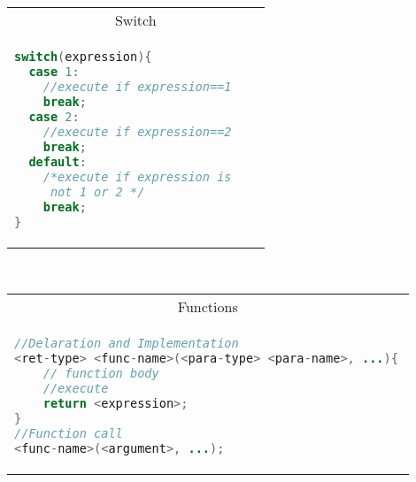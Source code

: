 \documentclass[a4paper, 8pt]{extarticle}
\begin{document}
\begin{minipage}[t]{0.25\linewidth}
\begin{tabular}[t]{|p{0.9\linewidth}|}
\multicolumn{1}{|c|}{\cellcolor{headcol}\color{white}Switch}
\\
\begin{lstlisting}[language=Java, mathescape, aboveskip=-2pt,belowskip=-7pt]
switch(expression){
  case 1:
    //execute if expression==1
    break;
  case 2:
    //execute if expression==2
    break;
  default:
    /*execute if expression is
     not 1 or 2 */
    break;
}
\end{lstlisting}
\\\hline
\end{tabular}
\\[3pt]
\begin{tabular}{|p{0.9\linewidth}|}
\multicolumn{1}{|c|}{\cellcolor{headcol}\color{white}Functions}\\
\begin{lstlisting}[language=Java, aboveskip=-2pt,belowskip=-7pt]
//Delaration and Implementation
<ret-type> <func-name>(<para-type> <para-name>, ...){
    // function body
    //execute
    return <expression>;
}
//Function call
<func-name>(<argument>, ...);
\end{lstlisting}
\\
\hline
\end{tabular}
\\[3pt]
\begin{tabular}{|p{0.9\linewidth}|}


\end{tabular}
\end{minipage}
\end{document}
